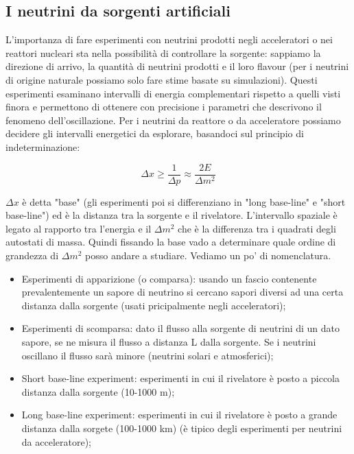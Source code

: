 \documentclass[11pt, oneside]{article}   	%
\begin{document}


\subsection{I neutrini da sorgenti artificiali}
L’importanza di fare esperimenti con neutrini prodotti negli acceleratori o nei reattori nucleari sta nella possibilità di controllare la sorgente: sappiamo la direzione di arrivo, la quantità di neutrini prodotti e il loro flavour (per i neutrini di origine naturale possiamo solo fare stime basate su simulazioni). Questi esperimenti esaminano intervalli di energia complementari rispetto a quelli visti finora e permettono di ottenere con precisione i parametri che descrivono il fenomeno dell'oscillazione. Per i neutrini da reattore o da acceleratore possiamo decidere gli intervalli energetici da esplorare, basandoci sul principio di indeterminazione: 

\begin{equation}
	\Delta x \geq \frac{1}{\Delta p} \approx \frac{2E}{\Delta m^2}
\end{equation}

\noindent $\Delta x$ è detta "base" (gli esperimenti poi si differenziano in "long base-line" e "short base-line") ed è la distanza tra la sorgente e il rivelatore. L'intervallo spaziale è legato al rapporto tra l'energia e il $\Delta m^2$ che è la differenza tra i quadrati degli autostati di massa. Quindi fissando la base vado a determinare quale ordine di grandezza di $\Delta m^2$ posso andare a studiare. Vediamo un po' di nomenclatura.

\begin{itemize}
	\item Esperimenti di apparizione (o comparsa): usando un fascio contenente prevalentemente un sapore di neutrino si cercano sapori diversi ad una certa distanza dalla sorgente (usati pricipalmente negli acceleratori);
	\item Esperimenti di scomparsa: dato il flusso alla sorgente di neutrini di un dato sapore, se ne misura il flusso a distanza L dalla sorgente. Se i neutrini oscillano il flusso sarà minore (neutrini solari e atmosferici);
	\item Short base-line experiment: esperimenti in cui il rivelatore è posto a piccola distanza dalla sorgente (10-1000 m);
	\item Long base-line experiment: esperimenti in cui il rivelatore è posto a grande distanza dalla sorgete (100-1000 km) (è tipico degli esperimenti per neutrini da acceleratore);
\end{itemize}
\end{document}
